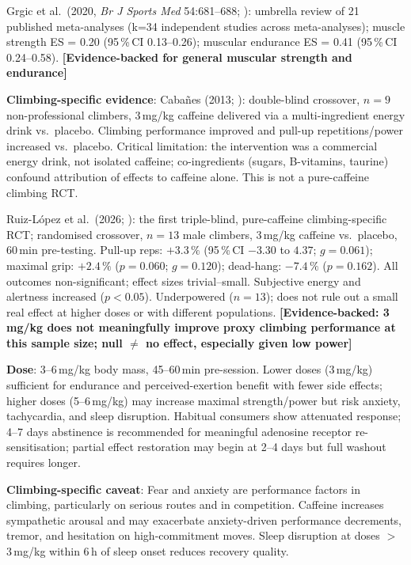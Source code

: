 Grgic et al.\ (2020, \textit{Br J Sports Med} 54:681--688; \cite{GGP+19}): umbrella review of 21 published meta-analyses (k=34 independent studies across meta-analyses); muscle strength ES = 0.20 (95\,\%\,CI 0.13--0.26); muscular endurance ES = 0.41 (95\,\%\,CI 0.24--0.58). \textbf{[Evidence-backed for general muscular strength and endurance]}

\textbf{Climbing-specific evidence}: Caba{\~n}es (2013; \cite{Cab13}): double-blind crossover, $n{=}9$ non-professional climbers, 3\,mg/kg caffeine delivered via a multi-ingredient energy drink vs.\ placebo. Climbing performance improved and pull-up repetitions/power increased vs.\ placebo. Critical limitation: the intervention was a commercial energy drink, not isolated caffeine; co-ingredients (sugars, B-vitamins, taurine) confound attribution of effects to caffeine alone. This is not a pure-caffeine climbing RCT.

Ruiz-L\'opez et al.\ (2026; \cite{RLMAMR+26}): the first triple-blind, pure-caffeine climbing-specific RCT; randomised crossover, $n{=}13$ male climbers, 3\,mg/kg caffeine vs.\ placebo, 60\,min pre-testing. Pull-up reps: $+3.3\,\%$ (95\,\%\,CI $-3.30$ to $4.37$; $g{=}0.061$); maximal grip: $+2.4\,\%$ ($p{=}0.060$; $g{=}0.120$); dead-hang: $-7.4\,\%$ ($p{=}0.162$). All outcomes non-significant; effect sizes trivial--small. Subjective energy and alertness increased ($p{<}0.05$). Underpowered ($n{=}13$); does not rule out a small real effect at higher doses or with different populations. \textbf{[Evidence-backed: 3\,mg/kg does not meaningfully improve proxy climbing performance at this sample size; null $\neq$ no effect, especially given low power]}

\textbf{Dose}: 3--6\,mg/kg body mass, 45--60\,min pre-session. Lower doses (3\,mg/kg) sufficient for endurance and perceived-exertion benefit with fewer side effects; higher doses (5--6\,mg/kg) may increase maximal strength/power but risk anxiety, tachycardia, and sleep disruption. Habitual consumers show attenuated response; 4--7 days abstinence is recommended for meaningful adenosine receptor re-sensitisation; partial effect restoration may begin at 2--4 days but full washout requires longer.

\textbf{Climbing-specific caveat}: Fear and anxiety are performance factors in climbing, particularly on serious routes and in competition. Caffeine increases sympathetic arousal and may exacerbate anxiety-driven performance decrements, tremor, and hesitation on high-commitment moves. Sleep disruption at doses $>$3\,mg/kg within 6\,h of sleep onset reduces recovery quality.

